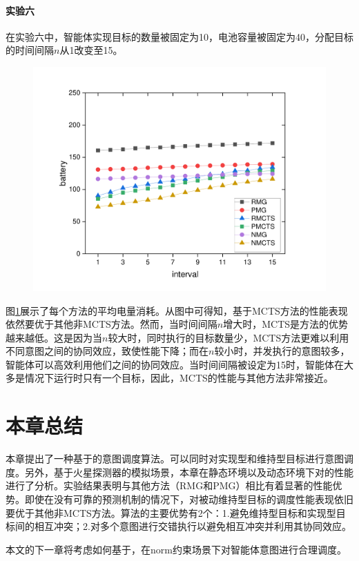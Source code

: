 \paragraph{实验六}
在实验六中，智能体实现目标的数量被固定为10，电池容量被固定为40，分配目标的时间间隔$n$从1改变至15。
\begin{figure}[h!]
\centering
\includegraphics[scale=0.4]{./figs/iX_cY_fixCap40G10}
\captionsetup{justification=centering}
\label{fig:dynamic3}
\end{figure}

图\ref{fig:dynamic3}展示了每个方法的平均电量消耗。从图中可得知，基于MCTS方法的性能表现依然要优于其他非MCTS方法。然而，当时间间隔$n$增大时，MCTS是方法的优势越来越低。这是因为当$n$较大时，同时执行的目标数量少，MCTS方法更难以利用不同意图之间的协同效应，致使性能下降；而在$n$较小时，并发执行的意图较多，智能体可以高效利用他们之间的协同效应。当时间间隔被设定为15时，智能体在大多是情况下运行时只有一个目标，因此，MCTS的性能与其他方法非常接近。
\section{本章总结}
本章提出了一种基于\SA 的意图调度算法\SAM 。\SAM 可以同时对实现型和维持型目标进行意图调度。另外，基于火星探测器的模拟场景，本章在静态环境以及动态环境下对\SAM 的性能进行了分析。实验结果表明\SAM 与其他方法（RMG和PMG）相比有着显著的性能优势。即使在没有可靠的预测机制的情况下，\SAM 对被动维持型目标的调度性能表现依旧要优于其他非MCTS方法。\SAM 算法的主要优势有2个：1.避免维持型目标和实现型目标间的相互冲突；2.对多个意图进行交错执行以避免相互冲突并利用其协同效应。

本文的下一章将考虑如何基于\SA，在norm约束场景下对智能体意图进行合理调度。
